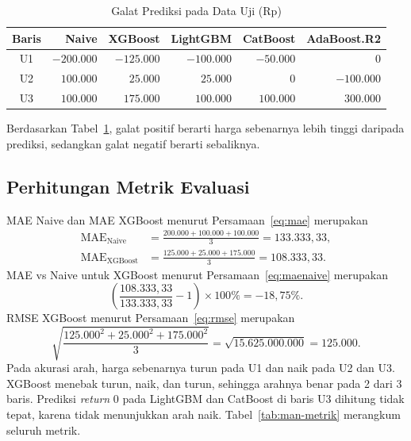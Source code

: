 \begin{table}[htbp]
  \caption{Galat Prediksi pada Data Uji (Rp)}
  \label{tab:man-galat}
  \centering
  \begingroup
  \footnotesize
  \setlength{\tabcolsep}{4pt}
  \begin{tabular}{|c|r|r|r|r|r|}
    \hline
    \textbf{Baris} & \textbf{Naive} & \textbf{XGBoost} & \textbf{LightGBM} & \textbf{CatBoost} & \textbf{AdaBoost.R2} \\
    \hline
    U1 & $-200.000$ & $-125.000$ & $-100.000$ & $-50.000$ & $0$ \\
    U2 & $100.000$ & $25.000$ & $25.000$ & $0$ & $-100.000$ \\
    U3 & $100.000$ & $175.000$ & $100.000$ & $100.000$ & $300.000$ \\
    \hline
  \end{tabular}
  \endgroup
\end{table}

Berdasarkan Tabel~\ref{tab:man-galat}, galat positif berarti harga sebenarnya
lebih tinggi daripada prediksi, sedangkan galat negatif berarti sebaliknya.

\subsection{Perhitungan Metrik Evaluasi}
MAE Naive dan MAE XGBoost menurut Persamaan~\eqref{eq:mae} merupakan
\begin{equation*}
  \begin{aligned}
  \text{MAE}_{\text{Naive}} &= \frac{200.000 + 100.000 + 100.000}{3}
    = 133.333{,}33, \\
  \text{MAE}_{\text{XGBoost}} &= \frac{125.000 + 25.000 + 175.000}{3}
    = 108.333{,}33 .
  \end{aligned}
\end{equation*}
MAE vs Naive untuk XGBoost menurut Persamaan~\eqref{eq:maenaive} merupakan
\begin{equation*}
  \left(\frac{108.333{,}33}{133.333{,}33} - 1\right) \times 100\% = -18{,}75\% .
\end{equation*}
RMSE XGBoost menurut Persamaan~\eqref{eq:rmse} merupakan
\begin{equation*}
  \sqrt{\frac{125.000^2 + 25.000^2 + 175.000^2}{3}}
  = \sqrt{15.625.000.000} = 125.000 .
\end{equation*}
Pada akurasi arah, harga sebenarnya turun pada U1 dan naik pada U2 dan U3.
XGBoost menebak turun, naik, dan turun, sehingga arahnya benar pada 2 dari 3
baris. Prediksi \textit{return} 0 pada LightGBM dan CatBoost di baris U3
dihitung tidak tepat, karena tidak menunjukkan arah naik.
Tabel~\ref{tab:man-metrik} merangkum seluruh metrik.

